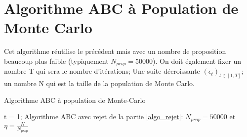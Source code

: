 \section{Algorithme ABC à Population de Monte Carlo}\label{algo_pmc}
Cet algorithme réutilise le précédent mais avec un nombre de proposition beaucoup plus faible (typiquement $N_{prop} = 50 000$). On doit également fixer un nombre T qui sera le nombre d'itérations; Une suite décroissante $(\epsilon_t)_{t\in[1, T]}$; un nombre N qui est la taille de la population de Monte Carlo.\\

\begin{algorithm}
\caption{Algorithme ABC à population de Monte-Carlo}
     \SetAlgoLined
     t = 1; Algorithme ABC avec rejet de la partie \ref{algo_rejet}: $N_{prop} = 50000$ et $\eta = \frac{N}{N_{prop}}$\;
     
\end{algorithm}


